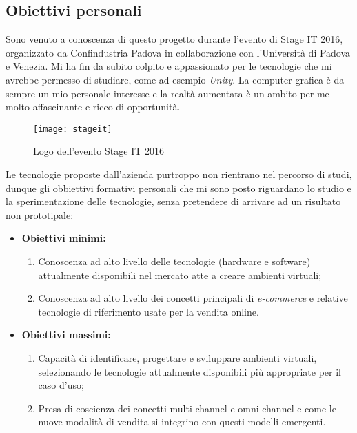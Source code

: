 \subsection{Obiettivi personali}

Sono venuto a conoscenza di questo progetto durante l'evento di Stage IT 2016, organizzato da Confindustria Padova in collaborazione con l'Università di Padova e Venezia. Mi ha fin da subito colpito e appassionato per le tecnologie che mi avrebbe permesso di studiare, come ad esempio \textit{Unity}. La computer grafica è da sempre un mio personale interesse e la realtà aumentata è un ambito per me molto affascinante e ricco di opportunità.

\label{Stage IT 2016}
\begin{figure}[ht]
	\begin{center}
		\texttt{[image: stageit]}
		\caption{Logo dell'evento Stage IT 2016}
	\end{center}
\end{figure}
\FloatBarrier

Le tecnologie proposte dall'azienda purtroppo non rientrano nel percorso di studi, dunque gli obbiettivi formativi personali che mi sono posto riguardano lo studio e la sperimentazione delle tecnologie, senza pretendere di arrivare ad un risultato non prototipale:

\begin{itemize}
	\item \textbf{Obiettivi minimi:}
	\begin{enumerate}
		\item Conoscenza ad alto livello delle tecnologie (hardware e software) attualmente disponibili nel mercato atte a creare ambienti virtuali;
		\item Conoscenza ad alto livello dei concetti principali di \textit{e-commerce} e relative tecnologie di riferimento usate per la vendita online.
	\end{enumerate}
	\item \textbf{Obiettivi massimi:}
	\begin{enumerate}
		\item Capacità di identificare, progettare e sviluppare ambienti virtuali, selezionando le tecnologie attualmente disponibili più appropriate per il caso d'uso;
		\item Presa di coscienza dei concetti multi-channel e omni-channel e come le nuove modalità di vendita si integrino con questi modelli emergenti.
	\end{enumerate}
\end{itemize}
